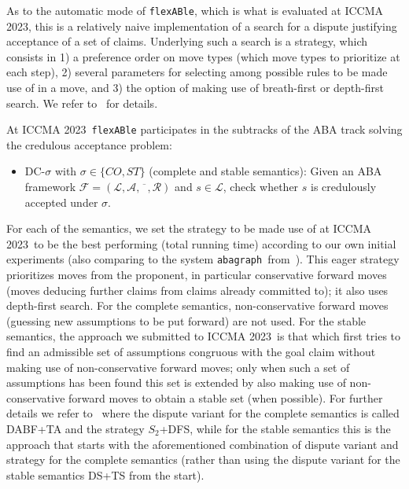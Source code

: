 \documentclass[conference]{IEEEtran}
\newcommand{\flexable}{\texttt{flexABle}\xspace}
\newcommand{\abagraph}{\texttt{abagraph}\xspace}
\newcommand{\iccma}{ICCMA 2023}
\newcommand{\frF}{\ensuremath{\mathcal{F}}\xspace}
\newcommand{\frL}{\ensuremath{\mathcal{L}}\xspace}
\newcommand{\frA}{\ensuremath{\mathcal{A}}\xspace}
\newcommand{\frCtr}{\ensuremath{\overline{\phantom{x}}}\xspace}
\newcommand{\frR}{\ensuremath{\mathcal{R}}\xspace}
\newcommand{\frTup}{\ensuremath{(\frL,\frA,\frCtr,\frR)}\xspace}
\newcommand{\fr}{\ensuremath{\frF = \frTup}\xspace}
\begin{document}
As to the automatic mode of \flexable, which is what is evaluated at \iccma, this is a relatively naive implementation of a search for a dispute justifying acceptance of a set of claims.  Underlying such a search is a strategy, which consists in 1) a preference order on move types (which move types to prioritize at each step), 2) several parameters for selecting among possible rules to be made use of in a move, and 3) the option of making use of breath-first or depth-first search.  We refer to~\cite{DiGaGo22,gor22} for details.

At \iccma~\flexable participates in the subtracks of the ABA track solving the credulous acceptance problem:

\begin{itemize}
\item DC-$\sigma$ with $\sigma \in \{CO, ST\}$ (complete and stable semantics): Given an ABA framework \fr and $s \in \frL$, check whether $s$ is credulously accepted under $\sigma$.
\end{itemize}

\noindent For each of the semantics, we set the strategy to be made use of at \iccma~to be the best performing (total running time) according to our own initial experiments (also comparing to the system \abagraph~from~\cite{CravenT16}).  This eager strategy prioritizes moves from the proponent, in particular conservative forward moves (moves deducing further claims from claims already committed to); it also uses depth-first search.  For the complete semantics, non-conservative forward moves (guessing new assumptions to be put forward) are not used. For the stable semantics, the approach we submitted to \iccma~is that which first tries to find an admissible set of assumptions congruous with the goal claim without making use of non-conservative forward moves; only when such a set of assumptions has been found this set is extended by also making use of non-conservative forward moves to obtain a stable set (when possible).  For further details we refer to~\cite{DiGaGo22,gor22} where the dispute variant for the complete semantics is called DABF+TA and the strategy $S_2$+DFS, while for the stable semantics this is the approach that starts with the aforementioned combination of dispute variant and strategy for the complete semantics (rather than using the dispute variant for the stable semantics DS+TS from the start).          

 









%
%
\end{document}
